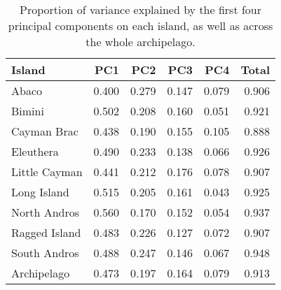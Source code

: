 \begin{table}[H]
    \caption{Proportion of variance explained by the first four principal components on each island, as well as across the whole archipelago.}
    \centering
    \begin{tabular}{lrrrrr}
        \hline
        Island & PC1 & PC2 & PC3 & PC4 & Total\\
        \hline
        Abaco & 0.400 & 0.279 & 0.147 & 0.079 & 0.906\\
        Bimini & 0.502 & 0.208 & 0.160 & 0.051 & 0.921\\
        Cayman Brac & 0.438 & 0.190 & 0.155 & 0.105 & 0.888\\
        Eleuthera & 0.490 & 0.233 & 0.138 & 0.066 & 0.926\\
        Little Cayman & 0.441 & 0.212 & 0.176 & 0.078 & 0.907\\
        Long Island & 0.515 & 0.205 & 0.161 & 0.043 & 0.925\\
        North Andros & 0.560 & 0.170 & 0.152 & 0.054 & 0.937\\
        Ragged Island & 0.483 & 0.226 & 0.127 & 0.072 & 0.907\\
        South Andros & 0.488 & 0.247 & 0.146 & 0.067 & 0.948\\
        Archipelago & 0.473 & 0.197 & 0.164 & 0.079 & 0.913\\
        \hline
    \end{tabular}
    \label{suptab:pcavariances}
\end{table}


